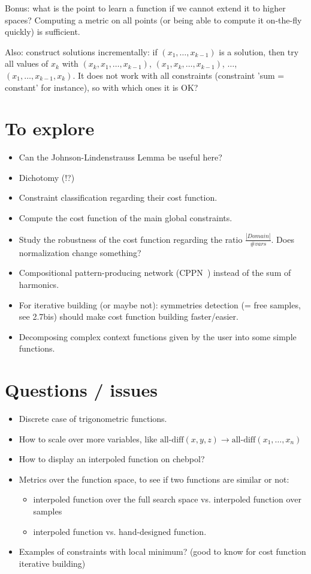 \documentclass[a4paper, 12pt]{article}
\begin{document}
Bonus: what is the point to learn a function if we cannot extend it to
higher spaces?  Computing a  metric on  all points  (or being  able to
compute it on-the-fly quickly) is sufficient.

Also: construct  solutions incrementally: if $(x_1,  \ldots, x_{k-1})$
is a solution,  then try all values of $x_k$  with $(x_k, x_1, \ldots,
x_{k-1})$,  $(x_1, x_k,  \ldots, x_{k-1})$,  $\ldots$, $(x_1,  \ldots,
x_{k-1}, x_k)$. It does not  work with all constraints (constraint 'sum
= constant' for instance), so with which ones it is OK?

\section{To explore}
\begin{itemize}
\item Can the Johnson-Lindenstrauss Lemma be useful here?
\item Dichotomy (!?)
\item Constraint classification regarding their cost function.
\item Compute the cost function of the main global constraints.
\item Study the robustness of the cost function regarding the ratio $\frac{|Domain|}{\# vars}$. Does normalization change something?
\item   Compositional  pattern-producing   network  (CPPN~\cite{CPPN})
  instead of the sum of harmonics.
\item For iterative  building (or maybe not):  symmetries detection (=
  free  samples,  see  2.7bis)  should  make  cost  function  building
  faster/easier.
\item Decomposing  complex context  functions given  by the  user into
  some simple functions.
\end{itemize}

\section{Questions / issues}
\begin{itemize}
\item Discrete case of trigonometric functions.
\item How to scale over more variables, like $\text{all-diff}(x, y, z)
  \rightarrow \text{all-diff}(x_1, \ldots, x_n)$
\item How to display an interpoled function on chebpol?
\item Metrics  over the function  space, to  see if two  functions are
  similar or not:
  \begin{itemize}
  \item interpoled function over the  full search space vs. interpoled
    function over samples
  \item interpoled function vs. hand-designed function.
  \end{itemize}
\item Examples of constraints with local minimum? (good to know for cost function iterative building)
\end{itemize}




\end{document}
